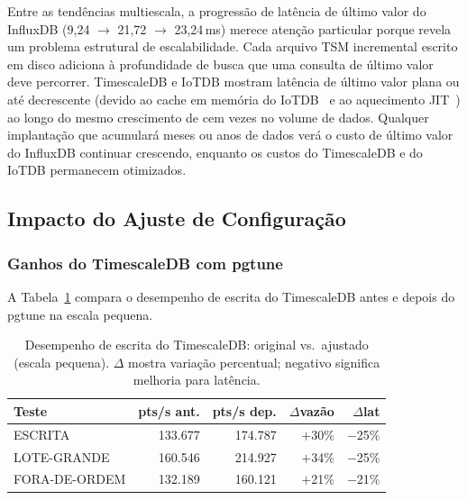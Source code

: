 Entre as tendências multiescala, a progressão de latência de último valor do InfluxDB
(9,24 $\to$ 21,72 $\to$ 23,24\,ms) merece atenção particular porque revela um problema
estrutural de escalabilidade. Cada arquivo TSM incremental escrito em disco adiciona à
profundidade de busca que uma consulta de último valor deve percorrer. TimescaleDB e IoTDB
mostram latência de último valor plana ou até decrescente (devido ao cache em memória
do IoTDB~\citep{iotdblastquery} e ao aquecimento JIT~\citep{barrett2017warmup})
ao longo do mesmo crescimento de cem vezes no volume de dados. Qualquer implantação que
acumulará meses ou anos de dados verá o custo de último valor do InfluxDB continuar crescendo,
enquanto os custos do TimescaleDB e do IoTDB permanecem otimizados.

\subsection{Impacto do Ajuste de Configuração}
\label{sec:tuning-results}

\subsubsection{Ganhos do TimescaleDB com pgtune}

A Tabela~\ref{tab:tsdb-tuning} compara o desempenho de escrita do TimescaleDB antes e depois
do pgtune na escala pequena.

\begin{table}[t]
  \centering
  \caption{Desempenho de escrita do TimescaleDB: original vs.\ ajustado (escala pequena).
  $\Delta$ mostra variação percentual; negativo significa melhoria para latência.}
  \label{tab:tsdb-tuning}
  \begin{tabular}{lrrrr}
    \hline
    \textbf{Teste} & \textbf{pts/s ant.} & \textbf{pts/s dep.} & $\Delta$vazão & $\Delta$lat \\
    \hline
    ESCRITA        & 133.677 & 174.787 & $+$30\% & $-$25\% \\
    LOTE-GRANDE    & 160.546 & 214.927 & $+$34\% & $-$25\% \\
    FORA-DE-ORDEM  & 132.189 & 160.121 & $+$21\% & $-$21\% \\
    \hline
  \end{tabular}
\end{table}

